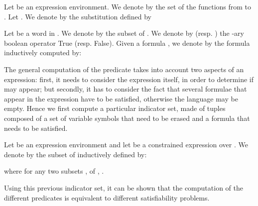 \documentclass[a4paper]{llncs}
\begin{document}
  Let  be an expression environment.
We denote by  the set of the functions from  to . 
  Let . We denote by  the substitution defined by 
  
    


  Let  be a word in . We denote by  the subset  of .  
  We denote by  (resp. ) the -ary boolean operator True (resp. False).  
      Given a formula , we denote by  the formula inductively computed by:
        
    
  The general computation of the  predicate  takes into
account two aspects of an expression: first, it needs to consider the expression itself, in order to determine if  may appear; but secondly, it has to consider the fact that several formulae that appear in the expression have to be satisfied, otherwise the language may be empty. Hence we first compute a particular indicator set, made of 
tuples composed of a set of variable symbols that need to be erased and a formula that needs to be satisfied.
  
  \begin{definition}[]
    Let  be an expression environment and let  be a constrained expression over . We denote by  the subset of  inductively defined by:
    \begin{multicols}{2}
        
      \end{multicols}
        where for any two subsets ,  of ,  .
  \end{definition}
  
  Using this previous indicator set, it can be shown that the computation of the different  predicates is equivalent to different satisfiability problems. 
  
\end{document}
